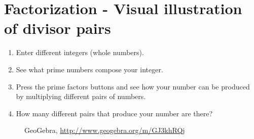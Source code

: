 \section{{Factorization - Visual illustration of divisor pairs}}
\begin{enumerate}[label=\arabic*.]

\item Enter different integers (whole numbers).

\item See what prime numbers compose your integer.

\item Press the prime factors buttons and see how your number can be produced by multiplying different pairs of numbers.

\item How many different pairs that produce your number are there?

\end{enumerate}

\begin{figure}[H]
\begin{center}
\caption*{GeoGebra, \url{http://www.geogebra.org/m/GJ3khRQj}}
\end{center}
\end{figure}


